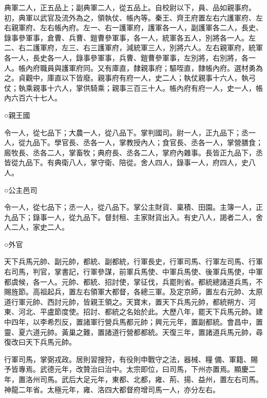 \begin{pinyinscope}
 典軍二人，正五品上；副典軍二人，從五品上。自校尉以下，員、品如親事府。初，典軍以武官及流外為之，領執仗、帳內等。秦王、齊王府置左右六護軍府、左右親軍府、左右帳內府。左一、右一護軍府，護軍各一人，副護軍各二人，長史、錄事參軍事，倉曹、兵曹、鎧曹參軍事，各一人，統軍各五人，別將各一人。左二、右二護軍府，左三、右三護軍府，減統軍三人，別將六人。左右親軍府，統軍各一人，長史各一人，錄事參軍事，兵曹、鎧曹參軍事，左別將，右別將，各一人。帳內府職員與護軍府同。又有庫直，隸親事府；驅咥直，隸帳內府。選材勇為之。貞觀中，庫直以下皆廢。親事府有府一人，史二人；執仗親事十六人，執弓仗；執乘親事十六人，掌供騎乘；親事三百三十人。帳內府有府一人，史一人，帳內六百六十七人。



 ○親王國



 令一人，從七品下；大農一人，從八品下。掌判國司。尉一人，正九品下；丞一人，從九品下。學官長、丞各一人，掌教授內人；食官長、丞各一人，掌營膳食；廄牧長、丞各二人，掌畜牧；典府長、丞各二人，掌府內雜事。長皆正九品下，丞皆從九品下。有典衛八人，掌守衛、陪從。舍人四人，錄事一人，府四人，史八人。



 ○公主邑司



 令一人，從七品下；丞一人，從八品下。掌公主財貨、稟積、田園。主簿一人，正九品下；錄事一人，從九品下。督封租、主家財貨出入。有史八人，謁者二人，舍人二人，家史二人。



 ○外官



 天下兵馬元帥、副元帥，都統、副都統，行軍長史，行軍司馬、行軍左司馬、行軍右司馬，判官，掌書記，行軍參謀，前軍兵馬使、中軍兵馬使、後軍兵馬使，中軍都虞候，各一人。元帥、都統、招討使，掌征伐，兵罷則省。都統總諸道兵馬，不賜旌節。高祖起兵，置左右領軍大都督，各總三軍。及定京師，置左右元帥、太原道行軍元帥、西討元帥，皆親王領之。天寶末，置天下兵馬元帥，都統朔方、河東、河北、平盧節度使。招討、都統之名始於此。大歷八年，罷天下兵馬元帥。建中四年，以李希烈反，置諸軍行營兵馬都元帥；興元元年，置副都統。會昌中，置靈、夏六道元帥。黃巢之難，置諸道行營都都統。天復三年，置諸道兵馬元帥，尋復改曰天下兵馬元帥。



 行軍司馬，掌弼戎政。居則習搜狩，有役則申戰守之法，器械、糧備、軍籍、賜予皆專焉。武德元年，改贊治曰治中。太宗即位，曰司馬，下州亦置焉。顯慶二年，置洛州司馬。武后大足元年，東都、北都，雍、荊、揚、益州，置左右司馬。神龍二年省。太極元年，雍、洛四大都督府增司馬一人，亦分左右。




\end{pinyinscope}
